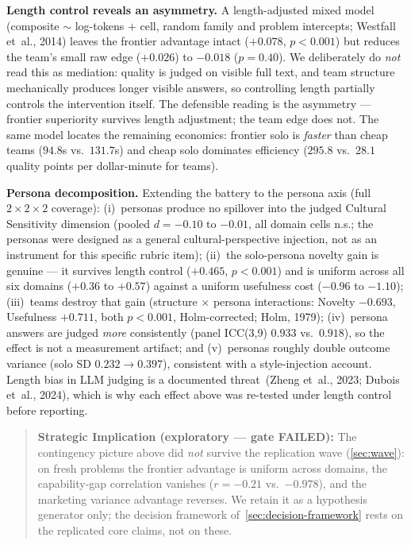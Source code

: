 \documentclass[12pt,a4paper]{article}
\begin{document}
\textbf{Length control reveals an asymmetry.} A length-adjusted mixed model
(composite $\sim$ log-tokens $+$ cell, random family and problem intercepts;
Westfall et~al., 2014) leaves the frontier advantage intact ($+0.078$,
$p < 0.001$) but reduces the team's small raw edge ($+0.026$) to $-0.018$
($p = 0.40$). We deliberately do \emph{not} read this as mediation: quality is
judged on visible full text, and team structure mechanically produces longer
visible answers, so controlling length partially controls the intervention
itself. The defensible reading is the asymmetry --- frontier superiority
survives length adjustment; the team edge does not. The same model locates the
remaining economics: frontier solo is \emph{faster} than cheap teams ($94.8$s
vs.\ $131.7$s) and cheap solo dominates efficiency ($295.8$ vs.\ $28.1$
quality points per dollar-minute for teams).

\textbf{Persona decomposition.} Extending the battery to the persona axis
(full $2\times2\times2$ coverage): (i)~personas produce no spillover into the
judged Cultural Sensitivity dimension (pooled $d = -0.10$ to $-0.01$, all
domain cells n.s.; the personas were designed as a general cultural-perspective
injection, not as an instrument for this specific rubric item); (ii)~the
solo-persona novelty gain is genuine --- it survives length control
($+0.465$, $p < 0.001$) and is uniform across all six domains ($+0.36$ to
$+0.57$) against a uniform usefulness cost ($-0.96$ to $-1.10$); (iii)~teams
destroy that gain (structure $\times$ persona interactions: Novelty $-0.693$,
Usefulness $+0.711$, both $p < 0.001$, Holm-corrected; Holm, 1979);
(iv)~persona answers are judged \emph{more} consistently (panel ICC(3,9)
$0.933$ vs.\ $0.918$), so the effect is not a measurement artifact; and
(v)~personas roughly double outcome variance (solo SD $0.232 \to 0.397$),
consistent with a style-injection account. Length bias in LLM judging is a
documented threat~(Zheng et~al., 2023; Dubois et~al., 2024), which is why each
effect above was re-tested under length control before reporting.

\begin{quote}
\textbf{Strategic Implication (exploratory --- gate FAILED):} The contingency
picture above did \emph{not} survive the replication wave
(\cref{sec:wave}): on fresh problems the frontier advantage is uniform across
domains, the capability-gap correlation vanishes ($r = -0.21$ vs.\
$-0.978$), and the marketing variance advantage reverses. We retain it as a
hypothesis generator only; the decision framework
of~\cref{sec:decision-framework} rests on the replicated core claims, not on
these.
\end{quote}
\end{document}
